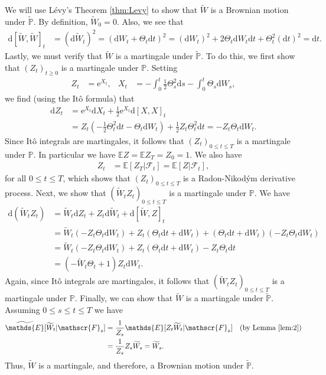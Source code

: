 \documentclass[12pt]{book}
\numberwithin{equation}{chapter}
\theoremstyle{plain}
\numberwithin{theorem}{section}
\theoremstyle{definition}
\numberwithin{exercise}{chapter}
\let\oldendproof\endproof
\renewenvironment{proof}[1][\proofname]{%
  \oldproof[\scshape\underline{#1}]%
}{\oldendproof}
\newcommand{\<}{\langle}
\renewcommand{\>}{\rangle}
\renewcommand{\(}{\left(}
\renewcommand{\)}{\right)}
\renewcommand{\[}{\left[}
\renewcommand{\]}{\right]}
\newcommand\Eb{\mathds{E}}
\newcommand\Pb{\mathds{P}}
\newcommand\Fc{\mathscr{F}}
\newcommand\Ebt{\widetilde{\Eb}}
\newcommand\Pbt{\widetilde{\Pb}}
\newcommand\Wt{\widetilde{W}}
\newcommand\dd{\mathrm{d}}
\newcommand\ee{\mathrm{e}}
\begin{document}
\begin{proof}
We will use L\'evy's Theorem \ref{thm:Levy} to show that $\Wt$ is a Brownian motion under $\Pbt$.  By definition, $\Wt_0 = 0$.  Also, we see that 
\begin{align}
\dd[ \Wt, \Wt ]_t 
	&= (\dd \Wt_t)^2
	=		(\dd W_t + \Theta_t \dd t)^2
	=		(\dd W_t)^2 + 2 \Theta_t \dd W_t \dd t + \Theta_t^2 (\dd t)^2 
	=		\dd t .  
\end{align}
Lastly, we must verify that $\Wt$ is a martingale under $\Pbt$.  To do this, we first show that $(Z_t)_{t \geq 0}$ is a martingale under $\Pb$.  Setting
\begin{align}
Z_t
	&=	\ee^{X_t} , &
X_t
	&=	- \int_0^t \tfrac{1}{2} \Theta_s^2 \dd s - \int_0^t \Theta_s \dd W_s ,
\end{align}
we find (using the It\^o formula) that
\begin{align}
\dd Z_t
	&=	\ee^{X_t} \dd X_t + \tfrac{1}{2} \ee^{X_t} \dd [X,X]_t \\
	&=	Z_t ( - \tfrac{1}{2} \Theta_t^2 \dd t - \Theta_t \dd W_t ) + \tfrac{1}{2} Z_t \Theta_t^2 \dd t
	=		- Z_t \Theta_t \dd W_t .
\end{align}
Since It\^o integrals are martingales, it follows that $(Z_t)_{0 \leq t \leq T}$ is a martingale under $\Pb$.  In particular we have
$\Eb Z = \Eb Z_T = Z_0 = 1$.  We also have
\begin{align}
Z_t
	&=	\Eb[ Z_T | \Fc_t] = \Eb[ Z | \Fc_t ] ,
\end{align}
for all $0 \leq t \leq T$, which shows that $(Z_t)_{0 \leq t \leq T}$ is a Radon-Nikod\'ym derivative process.
Next, we show that $(\Wt_t Z_t)_{0 \leq t \leq T}$ is a martingale under $\Pb$.  We have
\begin{align}
\dd (\Wt_t Z_t)
	&=	\Wt_t \dd Z_t + Z_t \dd \Wt_t + \dd[ \Wt, Z]_t \\
	&=	\Wt_t ( - Z_t \Theta_t \dd W_t )  + Z_t ( \Theta_t \dd t + \dd W_t )  +  (\Theta_t \dd t + \dd W_t )(- Z_t \Theta_t \dd W_t) \\
	&=	\Wt_t ( - Z_t \Theta_t \dd W_t )  + Z_t ( \Theta_t \dd t + \dd W_t )  - Z_t \Theta_t \dd t \\
	&=	( - \Wt_t \Theta_t + 1) Z_t \dd W_t .
\end{align}
Again, since It\^o integrals are martingales, it follows that $(\Wt_t Z_t)_{0 \leq t \leq T}$ is a martingale under $\Pb$.  Finally, we can show that $\Wt$ is a martingale under $\Pbt$.  Assuming $0 \leq s \leq t \leq T$ we have
\begin{align}
\Ebt[ \Wt_t | \Fc_s ]
	&=	\frac{1}{Z_s} \Eb[ Z_t \Wt_t | \Fc_s ] &
	&		\text{(by Lemma \ref{lem:2})} \\
	&=	\frac{1}{Z_s} Z_s \Wt_s
	=		\Wt_s .
\end{align}
Thus, $\Wt$ is a martingale, and therefore, a Brownian motion under $\Pbt$.
\end{proof}
\end{document}
